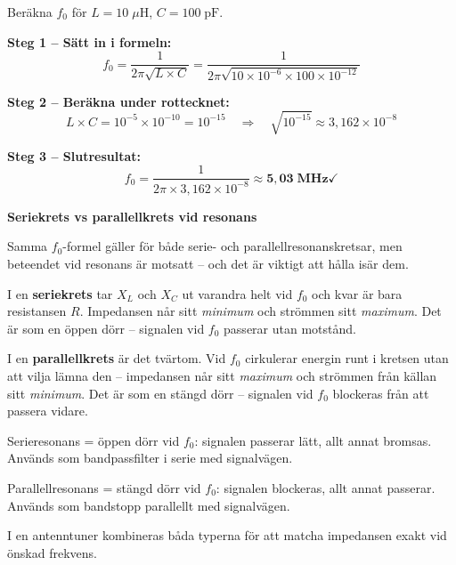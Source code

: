 \documentclass[a4paper,11pt,twoside]{book}
\newcommand{\emoji}[1]{{\emojifont #1}}
\begin{document}
\begin{worked}[title={Räkneexempel 1.8.2 -- Resonansfrekvens}]
Beräkna $f_0$ för $L = 10\;\mu\text{H}$, $C = 100\;\text{pF}$.

\textbf{Steg 1 -- Sätt in i formeln:}
\[
f_0 = \frac{1}{2\pi\sqrt{L \times C}}
    = \frac{1}{2\pi\sqrt{10 \times 10^{-6}
      \times 100 \times 10^{-12}}}
\]

\textbf{Steg 2 -- Beräkna under rottecknet:}
\[
L \times C = 10^{-5} \times 10^{-10} = 10^{-15}
\quad\Rightarrow\quad
\sqrt{10^{-15}} \approx 3{,}162 \times 10^{-8}
\]

\textbf{Steg 3 -- Slutresultat:}
\[
f_0 = \frac{1}{2\pi \times 3{,}162 \times 10^{-8}}
    \approx \mathbf{5{,}03\;\text{MHz}} \checkmark
\]
\end{worked}

\noindent\textbf{Seriekrets vs parallellkrets vid resonans}
\medskip

Samma $f_0$-formel gäller för både serie- och parallellresonanskretsar,
men beteendet vid resonans är motsatt -- och det är viktigt att hålla
isär dem.

I en \textbf{seriekrets} tar $X_L$ och $X_C$ ut varandra helt vid $f_0$
och kvar är bara resistansen $R$. Impedansen når sitt \emph{minimum}
och strömmen sitt \emph{maximum}. Det är som en öppen dörr -- signalen
vid $f_0$ passerar utan motstånd.

I en \textbf{parallellkrets} är det tvärtom. Vid $f_0$ cirkulerar
energin runt i kretsen utan att vilja lämna den -- impedansen når
sitt \emph{maximum} och strömmen från källan sitt \emph{minimum}.
Det är som en stängd dörr -- signalen vid $f_0$ blockeras från att
passera vidare.

\begin{storybox}[{\emoji{💡} Öppen eller stängd dörr}]
Serie\-resonans = öppen dörr vid $f_0$: signalen passerar lätt,
allt annat bromsas. Används som bandpassfilter i serie med signalvägen.

Parallell\-resonans = stängd dörr vid $f_0$: signalen blockeras,
allt annat passerar. Används som bandstopp parallellt med signalvägen.

I en antenntuner kombineras båda typerna för att matcha impedansen
exakt vid önskad frekvens.
\end{storybox}

\end{document}
